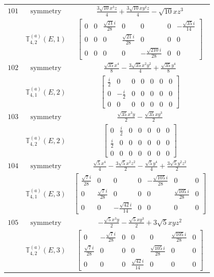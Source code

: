 \documentclass[fleqn,8pt,landscape]{jsarticle}
\begin{document}
\begin{longtable}{ccc}
$ 101 $ & $ \text{symmetry} $ & $ \frac{3 \sqrt{10} x^{3} z}{4} + \frac{3 \sqrt{10} x y^{2} z}{4} - \sqrt{10} x z^{3} $ \\
$  $ & $ \mathbb{T}_{4,2}^{(a)}(E,1) $ & $ \begin{bmatrix} 0 & 0 & \frac{\sqrt{21} i}{28} & 0 & 0 & 0 & - \frac{\sqrt{35} i}{14} \\ 0 & 0 & 0 & \frac{\sqrt{21} i}{28} & 0 & 0 & 0 \\ 0 & 0 & 0 & 0 & - \frac{\sqrt{210} i}{28} & 0 & 0 \end{bmatrix} $ \\ \hline
$ 102 $ & $ \text{symmetry} $ & $ \frac{\sqrt{35} x^{4}}{8} - \frac{3 \sqrt{35} x^{2} y^{2}}{4} + \frac{\sqrt{35} y^{4}}{8} $ \\
$  $ & $ \mathbb{T}_{4,1}^{(a)}(E,2) $ & $ \begin{bmatrix} \frac{i}{2} & 0 & 0 & 0 & 0 & 0 & 0 \\ 0 & - \frac{i}{2} & 0 & 0 & 0 & 0 & 0 \\ 0 & 0 & 0 & 0 & 0 & 0 & 0 \end{bmatrix} $ \\ \hline
$ 103 $ & $ \text{symmetry} $ & $ \frac{\sqrt{35} x^{3} y}{2} - \frac{\sqrt{35} x y^{3}}{2} $ \\
$  $ & $ \mathbb{T}_{4,2}^{(a)}(E,2) $ & $ \begin{bmatrix} 0 & \frac{i}{2} & 0 & 0 & 0 & 0 & 0 \\ \frac{i}{2} & 0 & 0 & 0 & 0 & 0 & 0 \\ 0 & 0 & 0 & 0 & 0 & 0 & 0 \end{bmatrix} $ \\ \hline
$ 104 $ & $ \text{symmetry} $ & $ \frac{\sqrt{5} x^{4}}{4} - \frac{3 \sqrt{5} x^{2} z^{2}}{2} - \frac{\sqrt{5} y^{4}}{4} + \frac{3 \sqrt{5} y^{2} z^{2}}{2} $ \\
$  $ & $ \mathbb{T}_{4,1}^{(a)}(E,3) $ & $ \begin{bmatrix} \frac{\sqrt{7} i}{28} & 0 & 0 & 0 & - \frac{\sqrt{105} i}{28} & 0 & 0 \\ 0 & \frac{\sqrt{7} i}{28} & 0 & 0 & 0 & \frac{\sqrt{105} i}{28} & 0 \\ 0 & 0 & - \frac{\sqrt{42} i}{14} & 0 & 0 & 0 & 0 \end{bmatrix} $ \\ \hline
$ 105 $ & $ \text{symmetry} $ & $ - \frac{\sqrt{5} x^{3} y}{2} - \frac{\sqrt{5} x y^{3}}{2} + 3 \sqrt{5} x y z^{2} $ \\
$  $ & $ \mathbb{T}_{4,2}^{(a)}(E,3) $ & $ \begin{bmatrix} 0 & - \frac{\sqrt{7} i}{28} & 0 & 0 & 0 & \frac{\sqrt{105} i}{28} & 0 \\ \frac{\sqrt{7} i}{28} & 0 & 0 & 0 & \frac{\sqrt{105} i}{28} & 0 & 0 \\ 0 & 0 & 0 & \frac{\sqrt{42} i}{14} & 0 & 0 & 0 \end{bmatrix} $ \\ \hline

\end{longtable}
\end{document}
